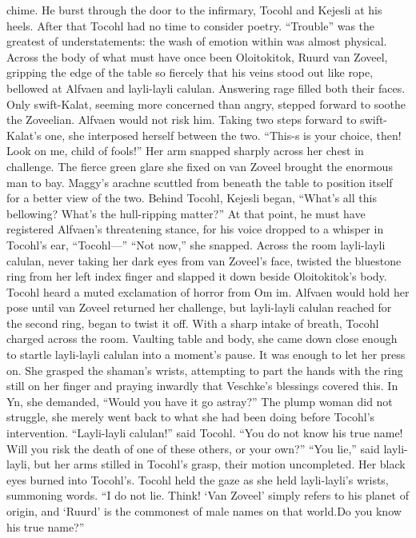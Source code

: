 \documentclass[9pt]{article}
\begin{document}
chime. He burst through the door to the infirmary, Tocohl and Kejesli at his heels. After that Tocohl had
no time to consider poetry.
“Trouble” was the greatest of understatements: the wash of emotion within was almost physical.
Across the body of what must have once been Oloitokitok, Ruurd van Zoveel, gripping the edge of
the table so fiercely that his veins stood out like rope, bellowed at Alfvaen and layli-layli calulan.
Answering rage filled both their faces. Only swift-Kalat, seeming more concerned than angry, stepped
forward to soothe the Zoveelian.
Alfvaen would not risk him. Taking two steps forward to swift-Kalat’s one, she interposed herself
between the two. “This-s is your choice, then! Look on me, child of fools!” Her arm snapped sharply
across her chest in challenge. The fierce green glare she fixed on van Zoveel brought the enormous man
to bay.
Maggy’s arachne scuttled from beneath the table to position itself for a better view of the two.
Behind Tocohl, Kejesli began, “What’s all this bellowing? What’s the hull-ripping matter?” At that point,
he must have registered Alfvaen’s threatening stance, for his voice dropped to a whisper in Tocohl’s ear,
“Tocohl—”
“Not now,” she snapped. Across the room layli-layli calulan, never taking her dark eyes from van
Zoveel’s face, twisted the bluestone ring from her left index finger and slapped it down beside
Oloitokitok’s body. Tocohl heard a muted exclamation of horror from Om im.
Alfvaen would hold her pose until van Zoveel returned her challenge, but layli-layli calulan reached
for the second ring, began to twist it off.
With a sharp intake of breath, Tocohl charged across the room. Vaulting table and body, she came
down close enough to startle layli-layli calulan into a moment’s pause. It was enough to let her press
on. She grasped the shaman’s wrists, attempting to part the hands with the ring still on her finger and
praying inwardly that Veschke’s blessings covered this. In Yn, she demanded, “Would you have it go
astray?”
The plump woman did not struggle, she merely went back to what she had been doing before
Tocohl’s intervention.
“Layli-layli calulan!” said Tocohl. “You do not know his true name! Will you risk the death of one
of these others, or your own?”
“You lie,” said layli-layli, but her arms stilled in Tocohl’s grasp, their motion uncompleted. Her black
eyes burned into Tocohl’s.
Tocohl held the gaze as she held layli-layli’s wrists, summoning words. “I do not lie. Think! ‘Van
Zoveel’ simply refers to his planet of origin, and ‘Ruurd’ is the commonest of male names on that world.Do you know his true name?”
\end{document}
